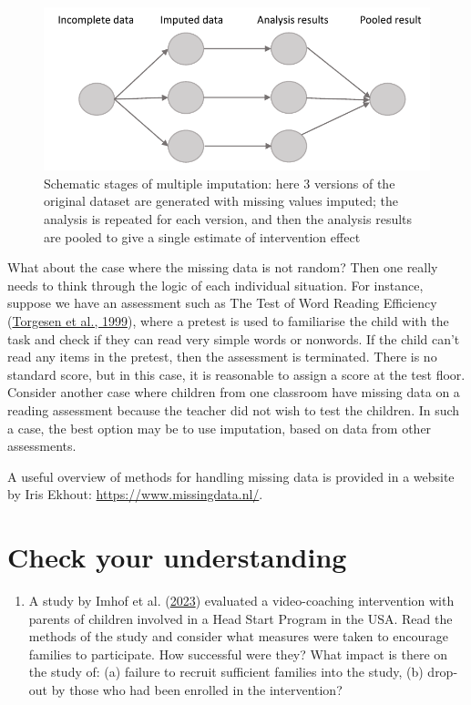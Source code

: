 \documentclass{krantz}
\providecommand{\tightlist}{%
\setlength{\itemsep}{0pt}\setlength{\parskip}{0pt}}
\begin{document}
\begin{center}
\begin{figure}
\includegraphics[width=0.75\linewidth]{images_bw/mice_fig} \caption{Schematic stages of multiple imputation: here 3 versions of the original dataset are generated with missing values imputed; the analysis is repeated for each version, and then the analysis results are pooled to give a single estimate of intervention effect}\label{fig:micefig}
\end{figure}
\end{center}

What about the case where the missing data is not random? Then one really needs to think through the logic of each individual situation. For instance, suppose we have an assessment such as The Test of Word Reading Efficiency (\protect\hyperlink{ref-torgesen1999}{Torgesen et al., 1999}), where a pretest is used to familiarise the child with the task and check if they can read very simple words or nonwords. If the child can't read any items in the pretest, then the assessment is terminated. There is no standard score, but in this case, it is reasonable to assign a score at the test floor. Consider another case where children from one classroom have missing data on a reading assessment because the teacher did not wish to test the children. In such a case, the best option may be to use imputation, based on data from other assessments.

A useful overview of methods for handling missing data is provided in a website by Iris Ekhout: \url{https://www.missingdata.nl/}.

\hypertarget{check-your-understanding-8}{%
\section{Check your understanding}\label{check-your-understanding-8}}

\begin{enumerate}
\def\labelenumi{\arabic{enumi}.}
\tightlist
\item
  A study by Imhof et al. (\protect\hyperlink{ref-imhof2023}{2023}) evaluated a video-coaching intervention with parents of children involved in a Head Start Program in the USA. Read the methods of the study and consider what measures were taken to encourage families to participate. How successful were they? What impact is there on the study of: (a) failure to recruit sufficient families into the study, (b) drop-out by those who had been enrolled in the intervention?
\end{enumerate}
\end{document}
